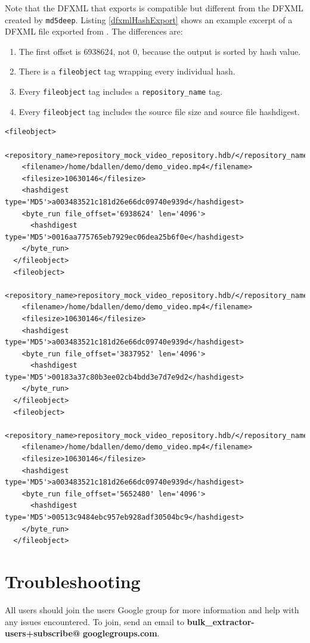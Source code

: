 \documentclass[11pt,fleqn]{article} %
\begin{document}
Note that the DFXML that \hdb exports is compatible but different from the DFXML created by \texttt{md5deep}. Listing \ref{dfxmlHashExport} shows an example excerpt of a DFXML file exported from \hdb. The differences are:
\begin{enumerate}
\item The first offset is 6938624, not 0,
because the output is sorted by hash value. 
\item There is a \texttt{fileobject} tag wrapping every individual hash.
\item Every \texttt{fileobject} tag includes a \texttt{repository\_name} tag.
\item Every \texttt{fileobject} tag includes the source file size and source file hashdigest.
\end{enumerate}

\lstset{style=customfile}
\begin{lstlisting}[float, caption=Excerpt of a DFXML exported by \hdb, label=dfxmlHashExport]
  <fileobject>
    <repository_name>repository_mock_video_repository.hdb/</repository_name>
    <filename>/home/bdallen/demo/demo_video.mp4</filename>
    <filesize>10630146</filesize>
    <hashdigest type='MD5'>a003483521c181d26e66dc09740e939d</hashdigest>
    <byte_run file_offset='6938624' len='4096'>
      <hashdigest type='MD5'>0016aa775765eb7929ec06dea25b6f0e</hashdigest>
    </byte_run>
  </fileobject>
  <fileobject>
    <repository_name>repository_mock_video_repository.hdb/</repository_name>
    <filename>/home/bdallen/demo/demo_video.mp4</filename>
    <filesize>10630146</filesize>
    <hashdigest type='MD5'>a003483521c181d26e66dc09740e939d</hashdigest>
    <byte_run file_offset='3837952' len='4096'>
      <hashdigest type='MD5'>00183a37c80b3ee02cb4bdd3e7d7e9d2</hashdigest>
    </byte_run>
  </fileobject>
  <fileobject>
    <repository_name>repository_mock_video_repository.hdb/</repository_name>
    <filename>/home/bdallen/demo/demo_video.mp4</filename>
    <filesize>10630146</filesize>
    <hashdigest type='MD5'>a003483521c181d26e66dc09740e939d</hashdigest>
    <byte_run file_offset='5652480' len='4096'>
      <hashdigest type='MD5'>00513c9484ebc957eb928adf30504bc9</hashdigest>
    </byte_run>
  </fileobject>
\end{lstlisting}




\section{Troubleshooting}
\label{DebuggingHashdb}
All \hdb users should join the \bulk users Google group for more information and help with any issues encountered. To join, send an email to \textbf{bulk\_extractor-users+subscribe@} \textbf{googlegroups.com}.  \\
\end{document}
